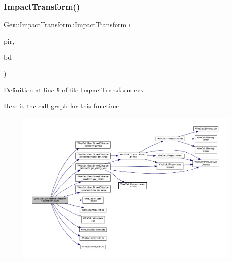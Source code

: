 \subsubsection{\texorpdfstring{Impact\+Transform()}{ImpactTransform()}}
{\footnotesize\ttfamily Gen\+::\+Impact\+Transform\+::\+Impact\+Transform (\begin{DoxyParamCaption}\item[{\hyperlink{class_wire_cell_1_1_interface_a09c548fb8266cfa39afb2e74a4615c37}{I\+Plane\+Impact\+Response\+::pointer}}]{pir,  }\item[{\hyperlink{class_wire_cell_1_1_gen_1_1_binned_diffusion__transform}{Binned\+Diffusion\+\_\+transform} \&}]{bd }\end{DoxyParamCaption})}



Definition at line 9 of file Impact\+Transform.\+cxx.

Here is the call graph for this function\+:
\nopagebreak
\begin{figure}[H]
\begin{center}
\leavevmode
\includegraphics[width=350pt]{class_wire_cell_1_1_gen_1_1_impact_transform_ad467b6b26b2e740a1c170cb8a5223e6e_cgraph}
\end{center}
\end{figure}
\mbox{\label{class_wire_cell_1_1_gen_1_1_impact_transform_a01530f803d5d1cc06688fb37e4163acb}} 
